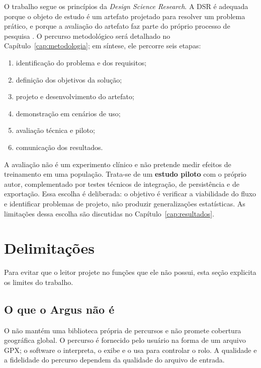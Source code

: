 O trabalho segue os princípios da \textit{Design Science Research}. A DSR é
adequada porque o objeto de estudo é um artefato projetado para resolver um
problema prático, e porque a avaliação do artefato faz parte do próprio processo
de pesquisa \cite{hevner2004}. O percurso metodológico será detalhado no
Capítulo~\ref{cap:metodologia}; em síntese, ele percorre seis etapas:

\begin{enumerate}
    \item identificação do problema e dos requisitos;
    \item definição dos objetivos da solução;
    \item projeto e desenvolvimento do artefato;
    \item demonstração em cenários de uso;
    \item avaliação técnica e piloto;
    \item comunicação dos resultados.
\end{enumerate}

A avaliação não é um experimento clínico e não pretende medir efeitos de
treinamento em uma população. Trata-se de um \textbf{estudo piloto} com o
próprio autor, complementado por testes técnicos de integração, de persistência
e de exportação. Essa escolha é deliberada: o objetivo é verificar a
viabilidade do fluxo e identificar problemas de projeto, não produzir
generalizações estatísticas. As limitações dessa escolha são discutidas no
Capítulo~\ref{cap:resultados}.

\section{Delimitações}
\label{sec:delimitacoes}

Para evitar que o leitor projete no \argus{} funções que ele não possui, esta
seção explicita os limites do trabalho.

\subsection{O que o Argus não é}
\label{sec:o-que-nao-e}

O \argus{} não mantém uma biblioteca própria de percursos e não promete
cobertura geográfica global. O percurso é fornecido
pelo usuário na forma de um arquivo GPX; o software o interpreta, o exibe e o
usa para controlar o rolo. A qualidade e a fidelidade do percurso dependem
da qualidade do arquivo de entrada.

